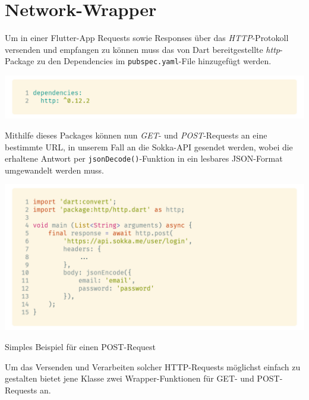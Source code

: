 \section{Network-Wrapper}

Um in einer Flutter-App Requests sowie Responses über das \textit{HTTP}-Protokoll versenden und empfangen zu können
muss das von Dart bereitgestellte \textit{http}-Package zu den Dependencies im \lstinline{pubspec.yaml}-File hinzugefügt
werden.

\begin{code}
    \centering
    \includegraphics[width=1\textwidth]{images/Client/util/network-wrapper/dependency.png}
    \vspace{-25pt}
    \caption{Hinzufügen des \textbf{http}-Packages zum \lstinline{pubspec.yaml}-File}
\end{code}

Mithilfe dieses Packages können nun \textit{GET}- und \textit{POST}-Requests an eine bestimmte URL, in unserem Fall
an die Sokka-API gesendet werden, wobei die erhaltene Antwort per \lstinline{jsonDecode()}-Funktion in ein lesbares
JSON-Format umgewandelt werden muss.

\begin{code}
    \centering
    \includegraphics[width=1\textwidth]{images/Client/util/network-wrapper/postRequest.png}
    \vspace{-25pt}
    \caption{Simples Beispiel für einen POST-Request}
\end{code}

\newpage

Um das Versenden und Verarbeiten solcher HTTP-Requests möglichst einfach zu gestalten bietet jene
Klasse zwei Wrapper-Funktionen für GET- und POST-Requests an.

